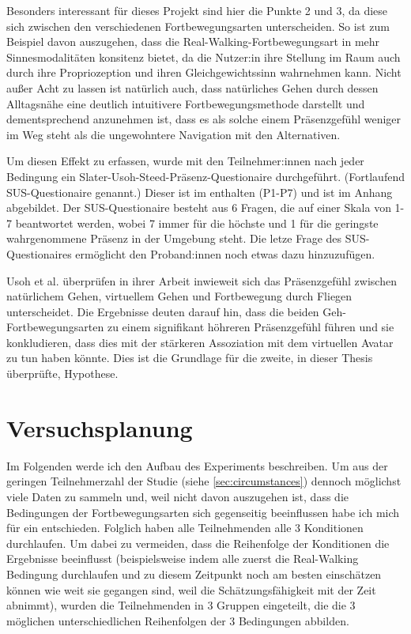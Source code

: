             Besonders interessant für dieses Projekt sind hier die Punkte 2 und 3, da diese sich zwischen den verschiedenen Fortbewegungsarten unterscheiden. So ist zum Beispiel davon auszugehen, dass die Real-Walking-Fortbewegungsart in mehr Sinnesmodalitäten konsitenz bietet, da die Nutzer:in ihre Stellung im Raum auch durch ihre Propriozeption und ihren Gleichgewichtssinn wahrnehmen kann.
            Nicht außer Acht zu lassen ist natürlich auch, dass natürliches Gehen durch dessen Alltagsnähe eine deutlich intuitivere Fortbewegungsmethode darstellt und dementsprechend anzunehmen ist, dass es als solche einem Präsenzgefühl weniger im Weg steht als die ungewohntere Navigation mit den Alternativen.

            Um diesen Effekt zu erfassen, wurde mit den Teilnehmer:innen nach jeder Bedingung ein Slater-Usoh-Steed-Präsenz-Questionaire \cite{presence-questionaire} durchgeführt. (Fortlaufend SUS-Questionaire genannt.) Dieser ist im  enthalten (P1-P7) und ist im Anhang abgebildet. Der SUS-Questionaire besteht aus 6 Fragen, die auf einer Skala von 1-7 beantwortet werden, wobei 7 immer für die höchste und 1 für die geringste wahrgenommene Präsenz in der Umgebung steht. Die letze Frage des SUS-Questionaires ermöglicht den Proband:innen noch etwas dazu hinzuzufügen.

            Usoh et al. überprüfen in ihrer Arbeit \cite{usoh-vergleich-1999} inwieweit sich das Präsenzgefühl zwischen natürlichem Gehen, virtuellem Gehen und Fortbewegung durch Fliegen unterscheidet. Die Ergebnisse deuten darauf hin, dass die beiden Geh-Fortbewegungsarten zu einem signifikant höhreren Präsenzgefühl führen und sie konkludieren, dass dies mit der stärkeren Assoziation mit dem virtuellen Avatar zu tun haben könnte. Dies ist die Grundlage für die zweite, in dieser Thesis überprüfte, Hypothese.



    \section{Versuchsplanung}\label{sec:setup}
    Im Folgenden werde ich den Aufbau des Experiments beschreiben.
    Um aus der geringen Teilnehmerzahl der Studie (siehe \autoref{sec:circumstances})
    dennoch möglichst viele Daten zu sammeln und, weil nicht davon auszugehen ist, dass die Bedingungen der Fortbewegungsarten sich gegenseitig beeinflussen habe ich mich für ein  entschieden. Folglich haben alle Teilnehmenden alle 3 Konditionen durchlaufen. Um dabei zu vermeiden, dass die Reihenfolge der Konditionen die Ergebnisse beeinflusst (beispielsweise indem alle zuerst die Real-Walking Bedingung durchlaufen und zu diesem Zeitpunkt noch am besten einschätzen können wie weit sie gegangen sind, weil die Schätzungsfähigkeit mit der Zeit abnimmt), wurden die Teilnehmenden in 3 Gruppen eingeteilt, die die 3 möglichen unterschiedlichen Reihenfolgen der 3 Bedingungen abbilden.

